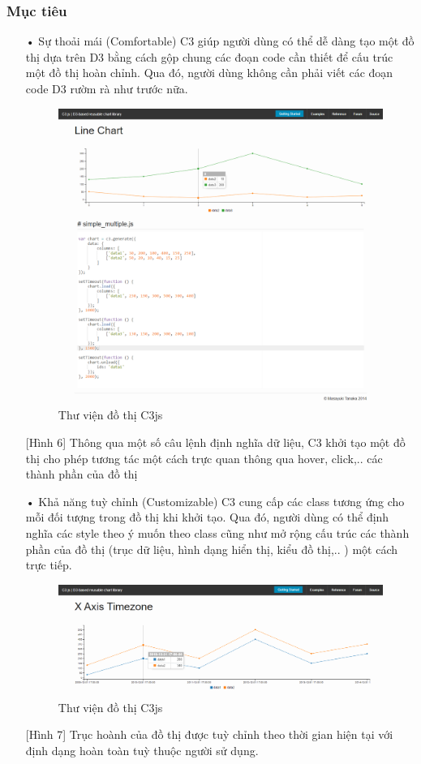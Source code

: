 \documentclass[12pt,a4paper,oneside]{article}
\begin{document}
\subsubsection{Mục tiêu}
\begin{itemize}
        \item[•]Sự thoải mái (Comfortable)
        C3 giúp người dùng có thể dễ dàng tạo một đồ thị dựa trên D3 bằng cách gộp chung các đoạn code cần thiết để cấu trúc một đồ thị hoàn chỉnh. Qua đó, người dùng không cần phải viết các đoạn code D3 rườm rà như trước nữa.
\begin{figure}[htp]
    \includegraphics[scale=.3]{image/c3syntax}
    \caption{Thư viện đồ thị C3js}
    \label{refhinh6}
\end{figure}
[Hình 6] Thông qua một số câu lệnh định nghĩa dữ liệu, C3 khởi tạo một đồ thị cho phép tương tác một cách trực quan thông qua hover, click,.. các thành phần của đồ thị

        \item[•]Khả năng tuỳ chỉnh (Customizable)
        C3 cung cấp các class tương ứng cho mỗi đối tượng trong đồ thị khi khởi tạo. Qua đó, người dùng có thể định nghĩa các style theo ý muốn theo class cũng như mở rộng cấu trúc các thành phần của đồ thị (trục dữ liệu, hình dạng hiển thị, kiểu đồ thị,.. ) một cách trực tiếp.
\begin{figure}[htp]
    \includegraphics[scale=.4]{image/c3custom}
    \caption{Thư viện đồ thị C3js}
    \label{refhinh7}
\end{figure}      
[Hình 7] Trục hoành của đồ thị được tuỳ chỉnh theo thời gian hiện tại với định dạng hoàn toàn tuỳ thuộc người sử dụng.
 

\end{itemize}
\end{document}
